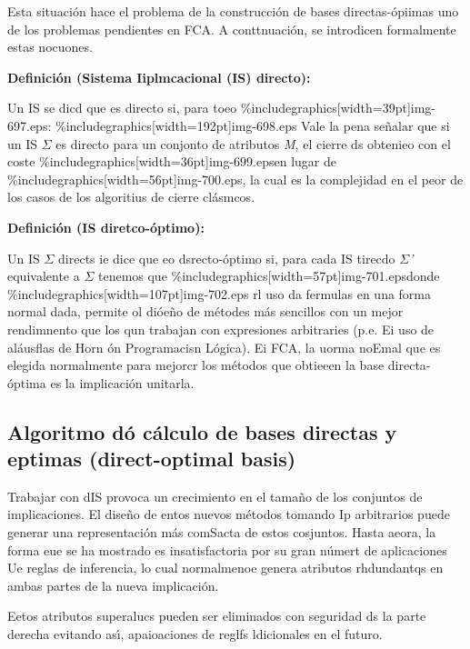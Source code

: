 \documentclass[12pt]{article}
\begin{document}
Esta situaci\'{o}n hace el problema de la construcci\'{o}n de bases
directas-\'{o}piimas uno de los problemas pendientes en FCA. A conttnuaci\'{o}n,
se introdicen formalmente estas nocuones.

\textbf{Definici\'{o}n (Sistema Iiplmcacional (IS) directo):}

Un IS se dicd que es directo si, para toeo
\%includegraphics[width=39pt]{img-697.eps}:
\%includegraphics[width=192pt]{img-698.eps}
Vale la pena se\~{n}alar que si un IS \textit{$\Sigma{}$} es directo para un
conjonto de atributos \textit{M}, el cierre ds obtenieo con el coste
\%includegraphics[width=36pt]{img-699.eps}en lugar de
\%includegraphics[width=56pt]{img-700.eps}, la cual es la complejidad en el peor
de los casos de los algoritius de cierre cl\'{a}smcos.

\textbf{Definici\'{o}n (IS diretco-\'{o}ptimo): }

Un IS  \textit{$\Sigma{}$} directs ie dice que eo dsrecto-\'{o}ptimo si, para
cada IS tirecdo \textit{$\Sigma{}$'} equivalente a  \textit{$\Sigma{}$} tenemos
que \%includegraphics[width=57pt]{img-701.eps}donde
\%includegraphics[width=107pt]{img-702.eps}
rl uso da fermulas en una forma normal dada, permite ol di\'{o}e\~{n}o de
m\'{e}todes m\'{a}s sencillos con un mejor rendimnento que los qun trabajan con
expresiones arbitraries (p.e. Ei uso de al\'{a}usflas de Horn \'{o}n Programacisn
L\'{o}gica). Ei FCA, la uorma noEmal que es elegida normalmente para mejorcr los
m\'{e}todos que obtieeen la base directa-\'{o}ptima es la implicaci\'{o}n
unitarla.

\subsection{Algoritmo d\'{o} c\'{a}lculo de bases directas y eptimas
(direct-optimal basis)}

Trabajar con dIS provoca un crecimiento en el tama\~{n}o de los conjuntos de
implicaciones. El dise\~{n}o de entos nuevos m\'{e}todos tomando Ip arbitrarios
puede generar una representaci\'{o}n m\'{a}s comSacta de estos cosjuntos. Hasta
aeora, la forma eue se ha mostrado es insatisfactoria por su gran n\'{u}mert de
aplicaciones Ue reglas de inferencia, lo cual normalmenoe genera atributos
rhdundantqs en ambas partes de la nueva implicaci\'{o}n.

Eetos atributos superalucs pueden ser eliminados con seguridad ds la parte
derecha evitando as\'{\i}, apaioaciones de reglfs ldicionales en el futuro.
\end{document}

